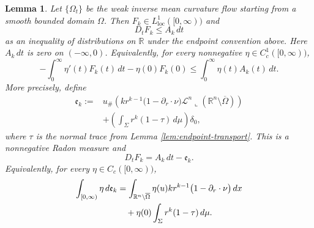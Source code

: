 \documentclass[11pt,reqno]{amsart}
\numberwithin{equation}{section}
\newtheorem{lemma}[theorem]{Lemma}
\theoremstyle{definition}
\newcommand{\R}{\mathbb R}
\newcommand{\Om}{\Omega}
\newcommand{\Sig}{\Sigma}
\begin{document}
\begin{lemma}\label{lem:transport}
Let $\{\Om_t\}$ be the weak inverse mean curvature flow starting from a smooth bounded domain $\Om$.  Then $F_k\in L^1_{\mathrm{loc}}([0,\infty))$ and
\begin{equation*}
    D_tF_k\leq A_k\,dt
\end{equation*}
as an inequality of distributions on $\mathbb R$ under the endpoint convention above. Here $A_k\,dt$ is zero on $(-\infty,0)$.  Equivalently, for every nonnegative $\eta\in C_c^1([0,\infty))$,
\begin{equation}\label{eq:distribution-F}
    -\int_0^\infty\eta'(t)F_k(t)\,dt-\eta(0)F_k(0)
    \leq
    \int_0^\infty\eta(t)A_k(t)\,dt.
\end{equation}
More precisely, define
\begin{equation}\label{eq:Euclidean-defect-measure-definition}
\begin{split}
    \mathfrak e_k
    :=&{u}_{\#}\left(
      kr^{k-1}\bigl(1-\partial_r\cdot\nu\bigr)
      \mathcal L^n\mathbin{\llcorner}
      (\R^n\setminus\overline\Om)\right)\\
    &+
      \left(\int_\Sig r^k(1-\tau)\,d\mu\right)\delta_0,
\end{split}
\end{equation}
where $\tau$ is the normal trace from Lemma \ref{lem:endpoint-transport}.  This is a nonnegative Radon measure and
\begin{equation}\label{eq:F-defect-measure}
    D_tF_k=A_k\,dt-\mathfrak e_k.
\end{equation}
Equivalently, for every $\eta\in C_c([0,\infty))$,
\begin{align}
    \int_{[0,\infty)}\eta\,d\mathfrak e_k
    &=\int_{\R^n\setminus\overline\Om}
      \eta(u)kr^{k-1}\bigl(1-\partial_r\cdot\nu\bigr)\,dx \notag\\
    &\quad+\eta(0)\int_\Sig r^k(1-\tau)\,d\mu.\label{eq:Euclidean-defect}
\end{align}
\end{lemma}
\end{document}
